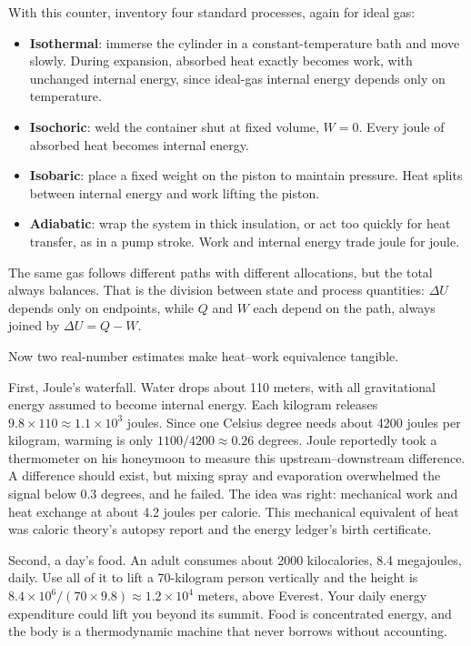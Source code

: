 \begin{mainline}
With this counter, inventory four standard processes, again for ideal gas:

\begin{itemize}
  \item \textbf{Isothermal}: immerse the cylinder in a constant-temperature bath and move slowly. During expansion, absorbed heat exactly becomes work, with unchanged internal energy, since ideal-gas internal energy depends only on temperature.
  \item \textbf{Isochoric}: weld the container shut at fixed volume, \(W=0\). Every joule of absorbed heat becomes internal energy.
  \item \textbf{Isobaric}: place a fixed weight on the piston to maintain pressure. Heat splits between internal energy and work lifting the piston.
  \item \textbf{Adiabatic}: wrap the system in thick insulation, or act too quickly for heat transfer, as in a pump stroke. Work and internal energy trade joule for joule.
\end{itemize}

The same gas follows different paths with different allocations, but the total always balances. That is the division between state and process quantities: \(\Delta U\) depends only on endpoints, while \(Q\) and \(W\) each depend on the path, always joined by \(\Delta U=Q-W\).

Now two real-number estimates make heat--work equivalence tangible.

First, Joule's waterfall. Water drops about 110 meters, with all gravitational energy assumed to become internal energy. Each kilogram releases \(9.8\times110\approx1.1\times10^{3}\) joules. Since one Celsius degree needs about 4200 joules per kilogram, warming is only \(1100/4200\approx0.26\) degrees. Joule reportedly took a thermometer on his honeymoon to measure this upstream--downstream difference. A difference should exist, but mixing spray and evaporation overwhelmed the signal below 0.3 degrees, and he failed. The idea was right: mechanical work and heat exchange at about 4.2 joules per calorie. This mechanical equivalent of heat was caloric theory's autopsy report and the energy ledger's birth certificate.

Second, a day's food. An adult consumes about 2000 kilocalories, 8.4 megajoules, daily. Use all of it to lift a 70-kilogram person vertically and the height is \(8.4\times10^{6}/(70\times9.8)\approx1.2\times10^{4}\) meters, above Everest. Your daily energy expenditure could lift you beyond its summit. Food is concentrated energy, and the body is a thermodynamic machine that never borrows without accounting.


\end{mainline}

